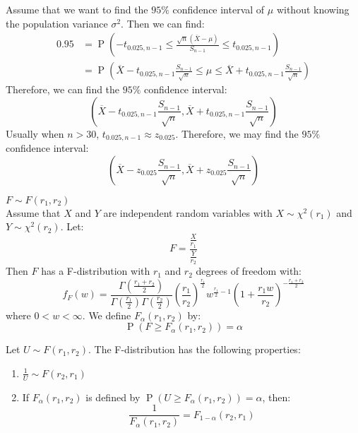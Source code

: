 \documentclass{huhtakm-template-book-v2}
\DeclareMathOperator{\prob}{P}
\begin{document}
\newpage
\begin{eg}
	Assume that we want to find the $95\%$ confidence interval of $\mu$ without knowing the population variance $\sigma^{2}$. Then we can find:
	\begin{align*}
		0.95&=\prob\left(-t_{0.025,n-1}\leq\frac{\sqrt{n}(\overline{X}-\mu)}{S_{n-1}}\leq t_{0.025,n-1}\right)\\
		&=\prob\left(\overline{X}-t_{0.025,n-1}\frac{S_{n-1}}{\sqrt{n}}\leq\mu\leq\overline{X}+t_{0.025,n-1}\frac{S_{n-1}}{\sqrt{n}}\right)
	\end{align*}
	Therefore, we can find the $95\%$ confidence interval:
	\begin{equation*}
		\left(\overline{X}-t_{0.025,n-1}\frac{S_{n-1}}{\sqrt{n}},\overline{X}+t_{0.025,n-1}\frac{S_{n-1}}{\sqrt{n}}\right)
	\end{equation*}
	Usually when $n>30$, $t_{0.025,n-1}\approx z_{0.025}$. Therefore, we may find the $95\%$ confidence interval:
	\begin{equation*}
		\left(\overline{X}-z_{0.025}\frac{S_{n-1}}{\sqrt{n}},\overline{X}+z_{0.025}\frac{S_{n-1}}{\sqrt{n}}\right)
	\end{equation*}
\end{eg}
\begin{eg} $F\sim F(r_{1},r_{2})$\\
	Assume that $X$ and $Y$ are independent random variables with $X\sim\chi^{2}(r_{1})$ and $Y\sim\chi^{2}(r_{2})$. Let:
	\begin{equation*}
		F=\frac{\frac{X}{r_{1}}}{\frac{Y}{r_{2}}}
	\end{equation*}
	Then $F$ has a F-distribution with $r_{1}$ and $r_{2}$ degrees of freedom with:
	\begin{equation*}
		f_{F}(w)=\frac{\Gamma\left(\frac{r_{1}+r_{2}}{2}\right)}{\Gamma\left(\frac{r_{1}}{2}\right)\Gamma\left(\frac{r_{2}}{2}\right)}\left(\frac{r_{1}}{r_{2}}\right)^{\frac{r_{1}}{2}}w^{\frac{r_{1}}{2}-1}\left(1+\frac{r_{1}w}{r_{2}}\right)^{-\frac{r_{1}+r_{2}}{2}}
	\end{equation*}
	where $0<w<\infty$. We define $F_{\alpha}(r_{1},r_{2})$ by:
	\begin{equation*}
		\prob(F\geq F_{\alpha}(r_{1},r_{2}))=\alpha
	\end{equation*}
\end{eg}
\begin{lem}
	Let $U\sim F(r_{1},r_{2})$. The F-distribution has the following properties:
	\begin{enumerate}
		\item $\frac{1}{U}\sim F(r_{2},r_{1})$
		\item If $F_{\alpha}(r_{1},r_{2})$ is defined by $\prob(U\geq F_{\alpha}(r_{1},r_{2}))=\alpha$, then:
		\begin{equation*}
			\frac{1}{F_{\alpha}(r_{1},r_{2})}=F_{1-\alpha}(r_{2},r_{1})
		\end{equation*}
	\end{enumerate}
\end{lem}
\end{document}
